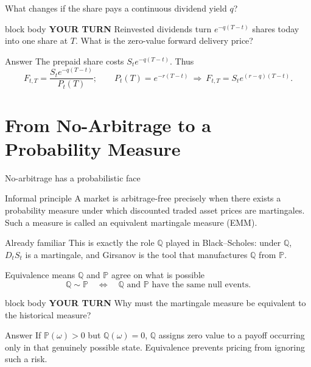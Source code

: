 \documentclass[handout,10pt,aspectratio=169]{beamer}
\newenvironment{pausebox}{\begin{beamercolorbox}[rounded=true,sep=0.8em,wd=\textwidth]{block body}
  \textbf{\color{CourseGold}YOUR TURN}\quad}{\end{beamercolorbox}}
\newcommand{\Pp}{\mathbb P}
\newcommand{\Q}{\mathbb Q}
\newcommand{\1}{\mathbf 1}
\begin{document}
\begin{frame}{What changes if the share pays a continuous dividend yield \(q\)?}
\begin{pausebox}
Reinvested dividends turn \(e^{-q(T-t)}\) shares today into one share at
\(T\). What is the zero-value forward delivery price?
\end{pausebox}

\begin{exampleblock}{Answer}
The prepaid share costs \(S_te^{-q(T-t)}\). Thus
\[
\boxed{F_{t,T}=\frac{S_te^{-q(T-t)}}{P_t(T)}};
\qquad
P_t(T)=e^{-r(T-t)}\ \Longrightarrow\
\boxed{F_{t,T}=S_te^{(r-q)(T-t)}}.
\]
\end{exampleblock}
\end{frame}



\section{From No-Arbitrage to a Probability Measure}

\begin{frame}{No-arbitrage has a probabilistic face}
\begin{block}{Informal principle}
A market is arbitrage-free precisely when there exists a probability measure
under which discounted traded asset prices are martingales. Such a measure
is called an equivalent martingale measure (EMM).
\end{block}
\begin{exampleblock}{Already familiar}
This is exactly the role \(\Q\) played in Black--Scholes: under \(\Q\),
\(D_tS_t\) is a martingale, and Girsanov is the tool that manufactures
\(\Q\) from \(\Pp\).
\end{exampleblock}
\end{frame}

\begin{frame}{Equivalence means \(\Q\) and \(\Pp\) agree on what is possible}
\[\Q\sim\Pp\quad\Longleftrightarrow\quad
  \Q\text{ and }\Pp\text{ have the same null events.}\]
\begin{pausebox}
Why must the martingale measure be equivalent to the historical measure?
\end{pausebox}

\begin{exampleblock}{Answer}
If \(\Pp(\omega)>0\) but \(\Q(\omega)=0\), \(\Q\) assigns zero value to a
payoff occurring only in that genuinely possible state. Equivalence prevents
pricing from ignoring such a risk.
\end{exampleblock}
\end{frame}
\end{document}

